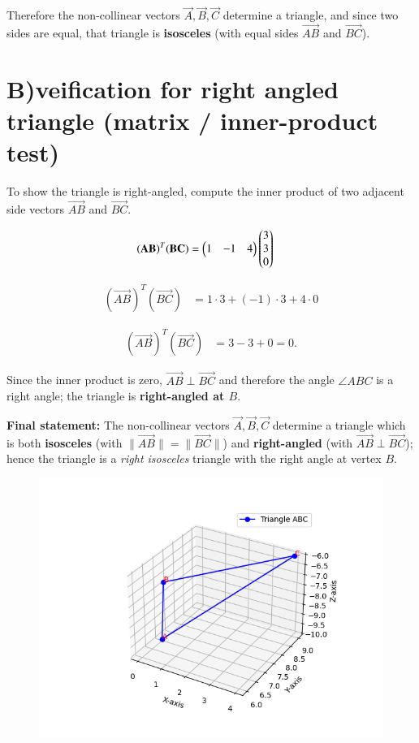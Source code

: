 \documentclass[journal]{IEEEtran}
\begin{document}
Therefore the non-collinear vectors $\vec{A},\vec{B},\vec{C}$ determine a triangle, and since two sides are equal, that triangle is \textbf{isosceles} (with equal sides $\vec{AB}$ and $\vec{BC}$).

\section*{B)veification for right angled triangle (matrix / inner-product test)}
To show the triangle is right-angled, compute the inner product of two adjacent side vectors $\vec{AB}$ and $\vec{BC}$.

\begin{align}
(\mathbf{AB})^T(\mathbf{BC}) &= \begin{pmatrix}1&-1&4\end{pmatrix}\begin{pmatrix}3\\3\\0\end{pmatrix}
\end{align}

\begin{align}
(\vec{AB})^T(\vec{BC}) &= 1\cdot 3 + (-1)\cdot 3 + 4\cdot 0
\end{align}

\begin{align}
(\vec{AB})^T(\vec{BC}) &= 3 - 3 + 0 = 0.
\end{align}

Since the inner product is zero, $\vec{AB}\perp\vec{BC}$ and therefore the angle $\angle ABC$ is a right angle; the triangle is \textbf{right-angled at $B$}.



\noindent\textbf{Final statement:} The non-collinear vectors $\vec{A},\vec{B},\vec{C}$ determine a triangle which is both \textbf{isosceles} (with $\|\vec{AB}\|=\|\vec{BC}\|$) and \textbf{right-angled} (with $\vec{AB}\perp\vec{BC}$); hence the triangle is a \emph{right isosceles} triangle with the right angle at vertex $B$.

\begin{figure}[H]
    \centering
    \includegraphics[width=0.9\columnwidth]{figs/fig1.png}
    \caption{}
    \label{fig:}
\end{figure}
\end{document}
